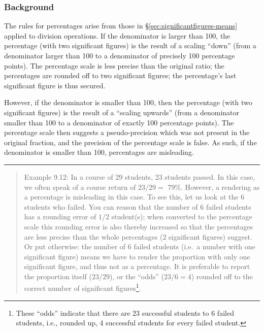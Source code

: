 \documentclass[
]{book}
\begin{document}
\hypertarget{background-1}{%
\subsubsection{Background}\label{background-1}}

The rules for percentages arise from those in
§\ref{sec:significantfigures-means} applied to division operations.
If the denominator is larger than 100, the percentage (with two significant
figures) is the result of a scaling ``down'' (from a denominator
larger than 100 to a denominator of precisely 100 percentage points).
The percentage scale is less precise than the original
ratio; the percentages are rounded off to two significant figures;
the percentage's last significant figure is thus secured.

However, if the denominator is smaller than 100, then the percentage (with
two significant figures) is the result of a ``scaling upwards'' (from a denominator
smaller than 100 to a denominator of exactly 100 percentage points). The percentage
scale then suggests a
pseudo-precision which was not present in the original fraction,
and the precision of the percentage scale is false. As such, if the denominator is
smaller than 100, percentages are misleading.

\begin{center}\rule{0.5\linewidth}{0.5pt}\end{center}

\begin{quote}
Example 9.12:
In a course of 29 students, 23 students passed. In this case, we often
speak of a course return of \(23/29=\) 79\%. However, a rendering as a
percentage is misleading in this case. To see this, let us look
at the 6 students who failed. You can reason that the number of 6 failed
students has a rounding error of \(1/2\) student(s); when converted to the
percentage scale this rounding error is also thereby increased so that
the percentages are less precise than the whole percentages (2
significant figures) suggest. Or put otherwise: the number of 6
failed students (i.e.~a number with one significant figure) means we have
to render the proportion with only one significant figure, and thus not
as a percentage. It is preferable to report the proportion itself (\(23/29\)), or
the ``odds'' (\(23/6=4\)) rounded off to the correct number of significant
figures\footnote{These ``odds'' indicate that there are 23 successful students to 6 failed students, i.e., rounded up, 4 successful students for every failed student.}.
\end{quote}
\end{document}
